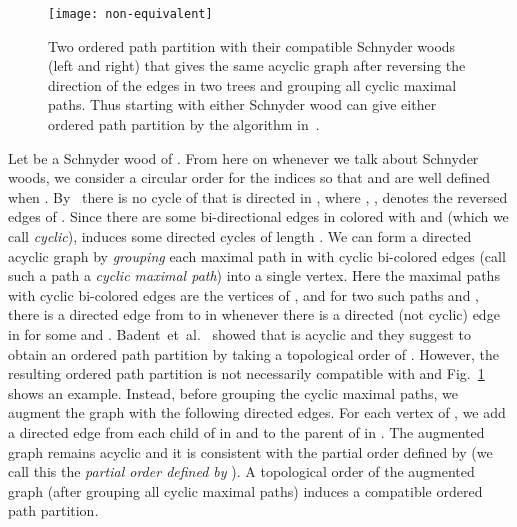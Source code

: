 \documentclass{article}
\newcommand{\df}{\textit}
\begin{document}
\begin{figure}[t]
\centering
\texttt{[image: non-equivalent]}
\caption{Two ordered path partition with their compatible Schnyder woods (left and right) that gives the
 same acyclic graph  after reversing the direction of the edges in two trees and grouping all cyclic
 maximal paths. Thus starting with either Schnyder wood can give either ordered path partition by the
 algorithm in~\cite{BBC11}.}
\label{fig:non-eq}
\end{figure}


Let  be a Schnyder wood of . From here on whenever
we talk about Schnyder woods, we consider a circular order for the indices  so that
 and  are well defined when . By~\cite{FZ08}
there is no cycle of  that is directed in , where
, , denotes the reversed edges of .
Since there are some bi-directional edges in  colored
with  and  (which we call \df{cyclic}),  induces some directed cycles of length . We can form a directed acyclic graph  by \textit{grouping}
each maximal path in  with cyclic bi-colored edges
(call such a path a \textit{cyclic maximal path}) into a single vertex. Here the maximal paths  with
cyclic bi-colored edges are the vertices of , and for
two such paths  and , there is a directed edge from  to  in  whenever
there is a directed (not cyclic) edge  in 
for some  and .
Badent~et~al.~\cite{BBC11} showed that  is acyclic and they suggest
to obtain an ordered path partition by taking a topological order of .
However, the resulting ordered path partition is not necessarily compatible with  and Fig.~\ref{fig:non-eq} shows an example.
Instead, before grouping the cyclic maximal paths, we augment the graph
 with the following directed edges.
For each vertex  of , we add a directed edge from each child of  in 
and  to the parent of  in . The augmented graph remains acyclic
and it is consistent with the partial order defined by  (we call this the \textit{partial order defined by
}).
A topological order of the augmented graph (after grouping all cyclic maximal paths)
induces a compatible ordered path partition.
\end{document}
